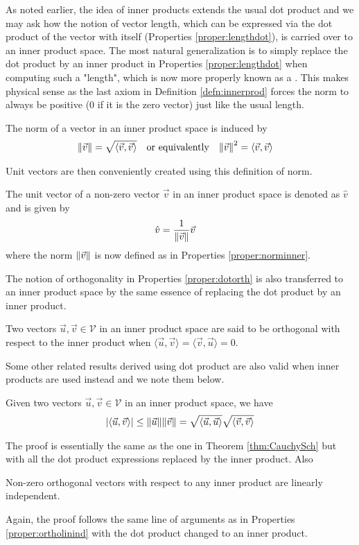 As noted earlier, the idea of inner products extends the usual dot product and we may ask how the notion of vector length, which can be expressed via the dot product of the vector with itself (Properties \ref{proper:lengthdot}), is carried over to an inner product space. The most natural generalization is to simply replace the dot product by an inner product in Properties \ref{proper:lengthdot} when computing such a "length", which is now more properly known as a . This makes physical sense as the last axiom in Definition \ref{defn:innerprod} forces the norm to always be positive ($0$ if it is the zero vector) just like the usual length.
\begin{proper}
\label{proper:norminner}
The norm of a vector in an inner product space is induced by
\begin{align*}
\norm{\vec{v}} &= \sqrt{\langle\vec{v} , \vec{v}\rangle} & &\text{or equivalently} &
\norm{\vec{v}}^2 &= \langle\vec{v} , \vec{v}\rangle
\end{align*}
\end{proper}
Unit vectors are then conveniently created using this definition of norm.
\begin{defn}
\label{defn:unitvecinner}
The unit vector of a non-zero vector $\vec{v}$ in an inner product space is denoted as $\hat{v}$ and is given by
\begin{align*}
\hat{v} &= \frac{1}{\norm{\vec{v}}}\vec{v}
\end{align*}
where the norm $\norm{\vec{v}}$ is now defined as in Properties \ref{proper:norminner}. 
\end{defn}
The notion of orthogonality in Properties \ref{proper:dotorth} is also transferred to an inner product space by the same essence of replacing the dot product by an inner product.
\begin{proper}
\label{proper:orthoinner}
Two vectors $\vec{u}, \vec{v} \in \mathcal{V}$ in an inner product space are said to be orthogonal with respect to the inner product when $\langle\vec{u} , \vec{v}\rangle = \langle\vec{v} , \vec{u}\rangle = 0$.
\end{proper}
Some other related results derived using dot product are also valid when inner products are used instead and we note them below.
\begin{thm}
\label{thm:cauchyschinner}
Given two vectors $\vec{u}, \vec{v} \in \mathcal{V}$ in an inner product space, we have
\begin{align*}
\abs{\langle\vec{u} , \vec{v}\rangle} \leq \norm{\vec{u}}\norm{\vec{v}} =  \sqrt{\langle\vec{u} , \vec{u}\rangle} \sqrt{\langle\vec{v} , \vec{v}\rangle}
\end{align*}
\end{thm}
The proof is essentially the same as the one in Theorem \ref{thm:CauchySch} but with all the dot product expressions replaced by the inner product. Also
\begin{proper}
Non-zero orthogonal vectors with respect to any inner product are linearly independent.
\end{proper}
Again, the proof follows the same line of arguments as in Properties \ref{proper:ortholinind} with the dot product changed to an inner product.

